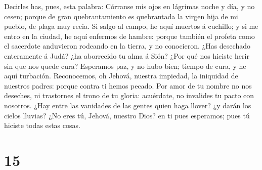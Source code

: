 Decirles has, pues, esta palabra: Córranse mis ojos en lágrimas noche y
día, y no cesen; porque de gran quebrantamiento es quebrantada la virgen
hija de mi pueblo, de plaga muy recia.  Si salgo al
campo, he aquí muertos á cuchillo; y si me entro en la ciudad, he aquí
enfermos de hambre: porque también el profeta como el sacerdote
anduvieron rodeando en la tierra, y no conocieron.  ¿Has
desechado enteramente á Judá? ¿ha aborrecido tu alma á Sión? ¿Por qué
nos hiciste herir sin que nos quede cura? Esperamos paz, y no hubo bien;
tiempo de cura, y he aquí turbación.  Reconocemos, oh
Jehová, nuestra impiedad, la iniquidad de nuestros padres: porque contra
ti hemos pecado.  Por amor de tu nombre no nos deseches,
ni trastornes el trono de tu gloria: acuérdate, no invalides tu pacto
con nosotros.  ¿Hay entre las vanidades de las gentes
quien haga llover? ¿y darán los cielos lluvias? ¿No eres tú, Jehová,
nuestro Dios? en ti pues esperamos; pues tú hiciste todas estas cosas.

\hypertarget{section-14}{%
\section{15}\label{section-14}}

